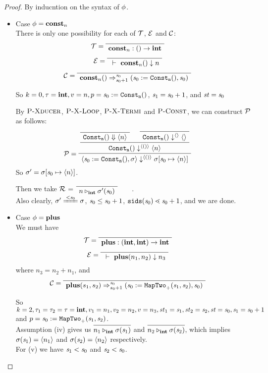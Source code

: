 \begin{proof}
By inducntion on the syntax of $\phi$.
\begin{itemize}
	\item \label{thm-case-const} Case $\phi = \mathbf{const}_{n}$ \\ 	
	There is only one possibility for each of $\mathcal{T}$, $\mathcal{E}$ and $\mathcal{C}$:
	$$\MT = \PT{ \Axiom{\Typef{\constn{n}}{}{\int}}}$$
	$$\ME = \PT{\Axiom{\Eval{}{\const{n}}{n}}}$$
	$$\MC = \PT{\Axiom{\Transf{\constn{n}}{}{\s_0}{\s_0+1}
			{\sfun{\sdef{\s_0}{\constaf{n}}}{\s_0}}}}$$

\def\pconst{\sdef{\s_0}{\constaf{n}}}
	So $k=0,\tau = \int, v = n, p = \pconst$, $\mathit{s}_1 = \mathit{s}_0+1$, and $\mathit{st} = \mathit{s}_0$

	By $\textsc{P-Xducer}$, $\textsc{P-X-Loop}$, $\textsc{P-X-Termi}$ and $\textsc{P-Const}$, we can construct $\mathcal{P}$ as follows:
	$$\PT{
		\Axiom{\blockf{\consta{n}}{}{\singl{n}}}
		\Axiom{\sevalfg{\consta{n}}{}{\emptyv}{\emptyv}}
		\BC{\sevalfg{\consta{n}}{}{\vunit}{\singl{n}}}
		\LeLa{\MP = }
		\UC{\seval{\pconst}{\sgm}{\vunit}{\sgm[\s_0 \|-> \singl{n}]}}			
	}$$
	So $\sgm' = \sgm[\s_0 \|-> \singl{n}]$.
	
	Then we take $\mathcal{R}$ = $\PT{\Axiom{\ValRep{n}{\int}{\sgm'(\s_0)}}}$. \\
	Also clearly, $\sgm' \ConEq{\s_0} \sgm$, $\mathit{s}_0 \le \mathit{s}_0 +1$, 
	$\sids{\s_0} \.< \s_0 +1$, and we are done.
		
	\item \label{thm-case-plus} Case $\phi = \mathbf{plus}$ \\ 	
	We must have 
	$$\MT = \PT{\Axiom{\Typef{\plusn}{\int,\int}{\int}}}$$
	$$\ME = \PT{\Axiom{\Eval{}{\plus{n_1}{n_2}}{n_3}}}$$ where $n_3 = n_2 + n_1$, and 
	$$\MC = \PT{\Axiom{\Transf{\plusn}{s_1,s_2}{\s_0}{s_0+1}
			{\sfun{\sdef{\s_0}{\maptwof{+}{\s_1}{\s_2}}}}{\s_0}}}$$

\def\pplus{\sdef{\s_0}{\maptwof{+}{\s_1}{\s_2}}}	
	So $k=2,\tau_1 = \tau_2 = \tau = \mathbf{int}, v_1= n_1, v_2= n_2, v = n_3,
	 \mathit{st}_1= \mathit{s}_1, \mathit{st}_2 = \mathit{s}_2, \mathit{st} = \mathit{s}_0, \mathit{s}_1 = \mathit{s}_0 +1$
	 and $p = \pplus$. \\
	 
	 Assumption (iv) gives us
	 $\infer{\ValRep{n_1}{\int}{\sgm(\s_1)}}{}$ and 
	 $\infer{\ValRep{n_2}{\int}{\sgm(\s_2)}}{}$, which implies
	 $\sigma(\mathit{s}_1) = \langle n_1 \rangle$ and $\sigma(\mathit{s}_2) = \langle n_2 \rangle$ respectively. \\
	 
	 For (v) we have $\mathit{s}_1 < \mathit{s}_0$ and $\mathit{s}_2 < \mathit{s}_0$. \\
	 

\end{itemize}
\end{proof}
